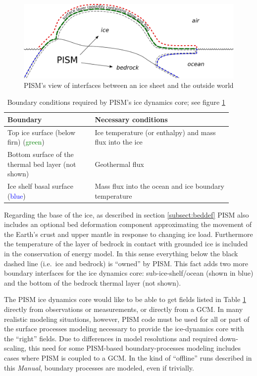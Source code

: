 \documentclass[titlepage,letterpaper,final]{scrartcl}
\begin{document}
\begin{figure}
  \centering
  \includegraphics[width=6in]{figs/climate-cartoon.pdf}
  \caption{PISM's view of interfaces between an ice sheet and the outside world}
  \label{fig:climate-inputs}
\end{figure}

\begin{table}[h]
  \centering
  \caption{Boundary conditions required by PISM's ice dynamics core; see figure
  \ref{fig:climate-inputs}}
  \begin{tabular}{p{0.35\linewidth}p{0.55\linewidth}}
    \toprule
    \textbf{Boundary} & \textbf{Necessary conditions}\\
    \midrule
    Top ice surface (below firn) (\textcolor{green}{green})& Ice temperature (or enthalpy) and mass flux into the ice\\
    Bottom surface of the thermal bed layer (not shown) & Geothermal flux\\
    Ice shelf basal surface (\textcolor{blue}{blue})& Mass flux into the ocean and ice boundary temperature\\
   \bottomrule
  \end{tabular}
 \label{tab:ice-dynamics-bc}
\end{table}

Regarding the base of the ice, as described in section \ref{subsect:beddef} PISM also includes an optional bed deformation component approximating the movement of the Earth's crust and upper mantle in response to changing ice load.   Furthermore the temperature of the layer of bedrock in contact with grounded ice is included in the conservation of energy model.  In this sense everything below the black dashed line (i.e.~ice and bedrock) is ``owned'' by PISM.  This fact adds two more boundary interfaces for the ice dynamics core: sub-ice-shelf/ocean (shown in blue) and the bottom of the bedrock thermal layer (not shown).

The PISM ice dynamics core would like to be able to get fields listed in Table
\ref{tab:ice-dynamics-bc} directly from observations or measurements, or directly from a GCM.  In many realistic modeling situations, however, PISM code must be used for all or part of the surface processes modeling necessary to provide the ice-dynamics core with the ``right'' fields.  Due to differences in model resolutions and required down-scaling, this need for some PISM-based boundary-processes modeling includes cases where PISM is coupled to a GCM.  In the kind of ``offline'' runs described in this \emph{Manual}, boundary processes are modeled, even if trivially.
\end{document}
